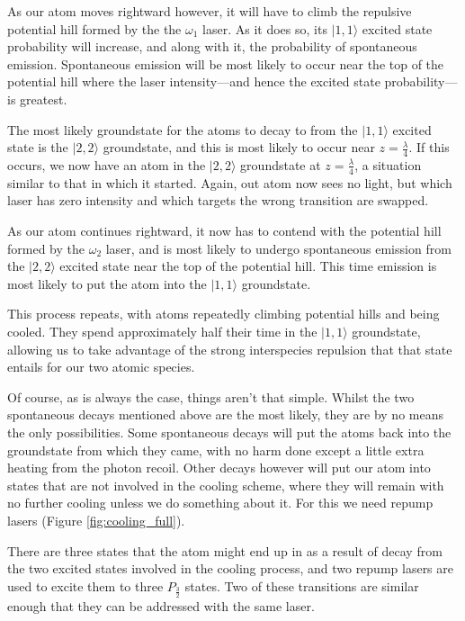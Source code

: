 As our atom moves rightward however, it will have to climb the repulsive potential hill formed by the the $\omega_1$ laser. As it does so, its $|1,1\rangle$ excited state probability will increase, and along with it, the probability of spontaneous emission. Spontaneous emission will be most likely to occur near the top of the potential hill where the laser intensity---and hence the excited state probability---is greatest.

The most likely groundstate for the atoms to decay to from the $|1,1\rangle$ excited state is the $|2,2\rangle$ groundstate, and this is most likely to occur near $z=\frac\lambda4$. If this occurs, we now have an atom in the $|2,2\rangle$ groundstate at $z=\frac\lambda4$, a situation similar to that in which it started. Again, out atom now sees no light, but which laser has zero intensity and which targets the wrong transition are swapped.

As our atom continues rightward, it now has to contend with the potential hill formed by the $\omega_2$ laser, and is most likely to undergo spontaneous emission from the $|2,2\rangle$ excited state near the top of the potential hill. This time emission is most likely to put the atom into the $|1,1\rangle$ groundstate.

This process repeats, with atoms repeatedly climbing potential hills and being cooled. They spend approximately half their time in the $|1,1\rangle$ groundstate, allowing us to take advantage of the strong interspecies repulsion that that state entails for our two atomic species.

Of course, as is always the case, things aren't that simple. Whilst the two spontaneous decays mentioned above are the most likely, they are by no means the only possibilities. Some spontaneous decays will put the atoms back into the groundstate from which they came, with no harm done except a little extra heating from the photon recoil. Other decays however will put our atom into states that are not involved in the cooling scheme, where they will remain with no further cooling unless we do something about it. For this we need repump lasers (Figure \ref{fig:cooling_full}).

There are three states that the atom might end up in as a result of decay from the two excited states involved in the cooling process, and two repump lasers are used to excite them to three $P_\frac32$ states. Two of these transitions are similar enough that they can be addressed with the same laser.

